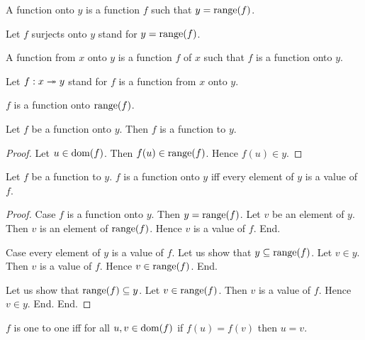 \documentclass[../../set-theory.ftl.tex]{subfiles}
\begin{document}
  \begin{forthel}
    \begin{definition}
      A function onto $y$ is a function $f$ such that $y = \operatorname{range}(f)$.
    \end{definition}

    Let $f$ surjects onto $y$ stand for $y = \operatorname{range}(f)$.

    \begin{definition}
      A function from $x$ onto $y$ is a function $f$ of $x$ such that $f$ is a function onto $y$.
    \end{definition}

    Let $f: x \twoheadrightarrow y$ stand for $f$ is a function from $x$ onto $y$.

    \begin{proposition}\label{SetTheory_02_01_677451}
      $f$ is a function onto $\operatorname{range}(f)$.
    \end{proposition}

    \begin{proposition}\label{SetTheory_02_01_495468}
      Let $f$ be a function onto $y$.
      Then $f$ is a function to $y$.
    \end{proposition}
    \begin{proof}
      Let $u \in \operatorname{dom}(f)$.
      Then $f(u) \in \operatorname{range}(f)$.
      Hence $f(u) \in y$.
    \end{proof}

    \begin{proposition}\label{SetTheory_02_01_195739}
      Let $f$ be a function to $y$.
      $f$ is a function onto $y$ iff every element of $y$ is a value of $f$.
    \end{proposition}
    \begin{proof}
      Case $f$ is a function onto $y$.
        Then $y = \operatorname{range}(f)$.
        Let $v$ be an element of $y$.
        Then $v$ is an element of $\operatorname{range}(f)$.
        Hence $v$ is a value of $f$.
      End.

      Case every element of $y$ is a value of $f$.
        Let us show that $y \subseteq \operatorname{range}(f)$.
          Let $v \in y$.
          Then $v$ is a value of $f$.
          Hence $v \in \operatorname{range}(f)$.
        End.

        Let us show that $\operatorname{range}(f) \subseteq y$.
          Let $v \in \operatorname{range}(f)$.
          Then $v$ is a value of $f$.
          Hence $v \in y$.
        End.
      End.
    \end{proof}

    \begin{definition}
      $f$ is one to one iff for all $u,v \in \operatorname{dom}(f)$ if $f(u) = f(v)$ then $u = v$.
    \end{definition}


\end{forthel}
\end{document}
